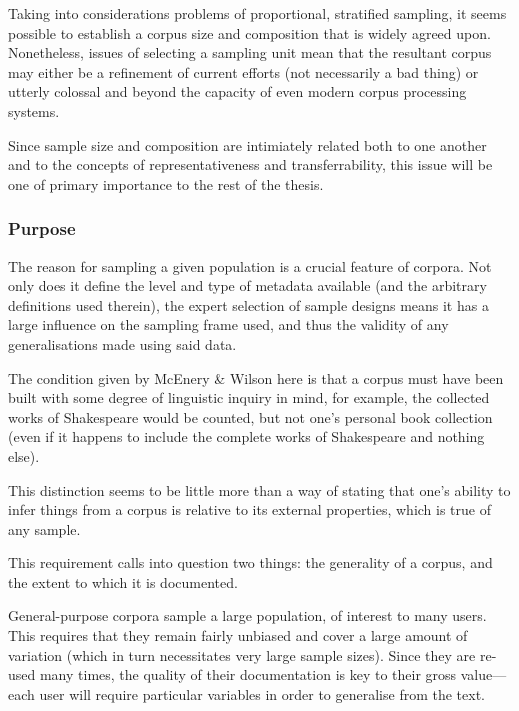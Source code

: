 Taking into considerations problems of proportional, stratified sampling, it seems possible to establish a corpus size and composition that is widely agreed upon.  Nonetheless, issues of selecting a sampling unit mean that the resultant corpus may either be a refinement of current efforts (not necessarily a bad thing) or utterly colossal and beyond the capacity of even modern corpus processing systems.

Since sample size and composition are intimiately related both to one another and to the concepts of representativeness and transferrability, this issue will be one of primary importance to the rest of the thesis.





\subsubsection{Purpose}
The reason for sampling a given population is a crucial feature of corpora.  Not only does it define the level and type of metadata available (and the arbitrary definitions used therein), the expert selection of sample designs means it has a large influence on the sampling frame used, and thus the validity of any generalisations made using said data.

The condition given by McEnery \& Wilson\cite{mcenery2001corpus} here is that a corpus must have been built with some degree of linguistic inquiry in mind, for example, the collected works of Shakespeare would be counted, but not one's personal book collection (even if it happens to include the complete works of Shakespeare and nothing else).

This distinction seems to be little more than a way of stating that one's ability to infer things from a corpus is relative to its external properties, which is true of any sample.

This requirement calls into question two things: the generality of a corpus, and the extent to which it is documented.

General-purpose corpora sample a large population, of interest to many users.  This requires that they remain fairly unbiased and cover a large amount of variation (which in turn necessitates very large sample sizes).  Since they are re-used many times, the quality of their documentation is key to their gross value---each user will require particular variables in order to generalise from the text.

